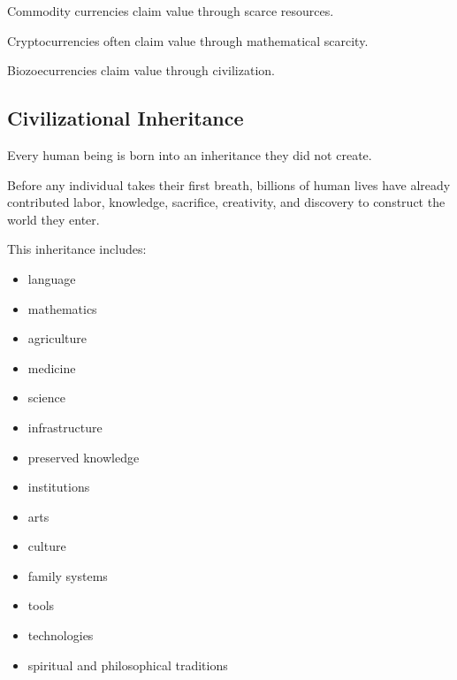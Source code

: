 ﻿\documentclass[12pt]{article}
\begin{document}
Commodity currencies claim value through scarce resources.

Cryptocurrencies often claim value through mathematical scarcity.

Biozoecurrencies claim value through civilization.

\subsection{Civilizational Inheritance}


Every human being is born into an inheritance they did not create.

Before any individual takes their first breath, billions of human lives have already contributed labor, knowledge, sacrifice, creativity, and discovery to construct the world they enter.

This inheritance includes:

\begin{itemize}
  \item language
\end{itemize}
\begin{itemize}
  \item mathematics
\end{itemize}
\begin{itemize}
  \item agriculture
\end{itemize}
\begin{itemize}
  \item medicine
\end{itemize}
\begin{itemize}
  \item science
\end{itemize}
\begin{itemize}
  \item infrastructure
\end{itemize}
\begin{itemize}
  \item preserved knowledge
\end{itemize}
\begin{itemize}
  \item institutions
\end{itemize}
\begin{itemize}
  \item arts
\end{itemize}
\begin{itemize}
  \item culture
\end{itemize}
\begin{itemize}
  \item family systems
\end{itemize}
\begin{itemize}
  \item tools
\end{itemize}
\begin{itemize}
  \item technologies
\end{itemize}
\begin{itemize}
  \item spiritual and philosophical traditions
\end{itemize}
\end{document}
